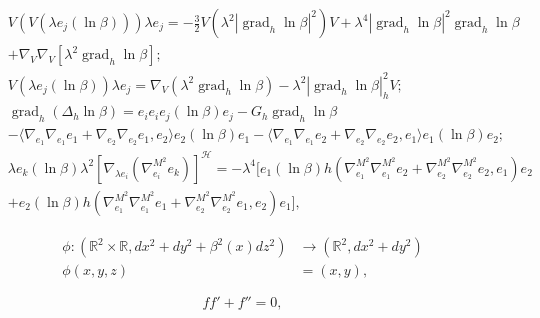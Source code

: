 \documentclass[12pt]{article}
\begin{document}
\begin{align*}
&V(V(\lambda e_{j}(\ln\beta))) \lambda e_{j}  = - \tfrac{3}{2} V(\lambda^2
|\operatorname{grad}_{h}\ln \beta|^2) V + \lambda^4|\operatorname{grad}_{h}\ln \beta|^2 \operatorname{grad}_{h}\ln \beta \\
& + \nabla_{V}\nabla_{V} [\lambda^2 \operatorname{grad}_{h}\ln \beta] ;\\
&V(\lambda e_{j}(\ln\beta)) \lambda e_{j} = \nabla_{V} (\lambda^2 \operatorname{grad}_{h}\ln \beta) - \lambda^2 |\operatorname{grad}_h \ln\beta |_{h}^2 V ;\\
&\operatorname{grad}_{h} (\Delta_{h} \ln\beta) = e_{i}e_{i}e_{j}(\ln\beta)e_{j} - G_h \operatorname{grad}_{h}\ln\beta\\
&- \langle \nabla_{e_{1}}\nabla_{e_{1}}e_{1}+ \nabla_{e_{2}}\nabla_{e_{2}}e_{1}
,e_{2}\rangle e_{2}(\ln\beta)e_{1}
 - \langle \nabla_{e_{1}}\nabla_{e_{1}}e_{2} + \nabla_{e_{2}}\nabla_{e_{2}}e_{2}
,e_{1}\rangle e_{1}(\ln\beta) e_{2} ;\\
& \lambda e_{k}(\ln\beta)\lambda^2 [\nabla_{\lambda e_i}(\nabla^{M^2}_{e_i}e_k)]^{\mathcal{H}}
= -\lambda^4 [ e_{1}(\ln\beta) h(\nabla^{M^2}_{e_1}\nabla^{M^2}_{e_1}e_2
+ \nabla^{M^2}_{e_2}\nabla^{M^2}_{e_2}e_2,e_1) e_2 \\
&+ e_{2}(\ln\beta) h(\nabla^{M^2}_{e_1}\nabla^{M^2}_{e_1}e_1 +
\nabla^{M^2}_{e_2}\nabla^{M^2}_{e_2}e_1,e_2) e_1 ],
\end{align*}

\begin{align*}
\phi : ({{\mathbb R}}^2 \times {{\mathbb R}} , dx^2 + dy^2 + \beta^2(x) dz^2) &\to ({{\mathbb R}}^2 , dx^2 + dy^2)\\
\phi(x,y,z) &= (x,y) ,
\end{align*}

$$ ff' + f'' =0 ,$$
\end{document}
